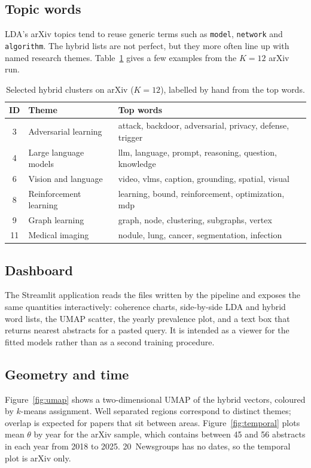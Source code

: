 \documentclass[11pt,a4paper]{article}
\begin{document}
\subsection{Topic words}
LDA's arXiv topics tend to reuse generic terms such as \texttt{model}, \texttt{network} and \texttt{algorithm}. The hybrid lists are not perfect, but they more often line up with named research themes. Table~\ref{tab:words} gives a few examples from the $K=12$ arXiv run.

\begin{table}[htbp]
\centering
\caption{Selected hybrid clusters on arXiv ($K=12$), labelled by hand from the top words.}
\label{tab:words}
\small
\begin{tabular}{@{}clp{9.6cm}@{}}
\toprule
ID & Theme & Top words \\
\midrule
3 & Adversarial learning & attack, backdoor, adversarial, privacy, defense, trigger \\
4 & Large language models & llm, language, prompt, reasoning, question, knowledge \\
6 & Vision and language & video, vlms, caption, grounding, spatial, visual \\
8 & Reinforcement learning & learning, bound, reinforcement, optimization, mdp \\
9 & Graph learning & graph, node, clustering, subgraphs, vertex \\
11 & Medical imaging & nodule, lung, cancer, segmentation, infection \\
\bottomrule
\end{tabular}
\end{table}

\subsection{Dashboard}
The Streamlit application reads the files written by the pipeline and exposes the same quantities interactively: coherence charts, side-by-side LDA and hybrid word lists, the UMAP scatter, the yearly prevalence plot, and a text box that returns nearest abstracts for a pasted query. It is intended as a viewer for the fitted models rather than as a second training procedure.

\subsection{Geometry and time}
Figure~\ref{fig:umap} shows a two-dimensional UMAP of the hybrid vectors, coloured by $k$-means assignment. Well separated regions correspond to distinct themes; overlap is expected for papers that sit between areas. Figure~\ref{fig:temporal} plots mean $\theta$ by year for the arXiv sample, which contains between 45 and 56 abstracts in each year from 2018 to 2025. 20~Newsgroups has no dates, so the temporal plot is arXiv only.
\end{document}
